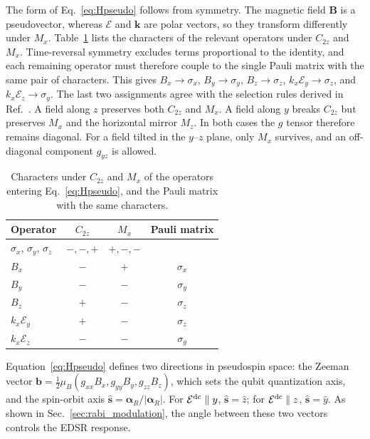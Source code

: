 \documentclass[
  aps,
  reprint,
  amsmath,
  amssymb,
  groupedaddress,
  floatfix,
  longbibliography,
]{revtex4-2}
\newcommand{\Edc}{\mathcal{E}^{\rm dc}}
\newcommand{\shat}{\hat{\mathbf s}}
\begin{document}
The form of Eq.~\eqref{eq:Hpseudo} follows from symmetry. The magnetic field $\mathbf{B}$ is a pseudovector, whereas $\boldsymbol{\mathcal{E}}$ and $\mathbf{k}$ are polar vectors, so they transform differently under $M_x$. Table~\ref{tab:symmetry} lists the characters of the relevant operators under $C_{2z}$ and $M_x$. Time-reversal symmetry excludes terms proportional to the identity, and each remaining operator must therefore couple to the single Pauli matrix with the same pair of characters. This gives $B_x\to\sigma_x$, $B_y\to\sigma_y$, $B_z\to\sigma_z$, $k_x\mathcal{E}_y\to\sigma_z$, and $k_x\mathcal{E}_z\to\sigma_y$. The last two assignments agree with the selection rules derived in Ref.~\cite{das2026anisotropic}. A field along $z$ preserves both $C_{2z}$ and $M_x$. A field along $y$ breaks $C_{2z}$ but preserves $M_x$ and the horizontal mirror $M_z$. In both cases the $g$ tensor therefore remains diagonal. For a field tilted in the $y$--$z$ plane, only $M_x$ survives, and an off-diagonal component $g_{yz}$ is allowed. 


\begin{table}[t]
\caption{Characters under $C_{2z}$ and $M_x$ of the operators entering Eq.~\eqref{eq:Hpseudo}, and the Pauli matrix with the same characters.}
\label{tab:symmetry}
\begin{ruledtabular}
\begin{tabular}{lccc}
Operator & $C_{2z}$ & $M_x$ & Pauli matrix\\
\hline
$\sigma_x$, $\sigma_y$, $\sigma_z$ & $-,-,+$ & $+,-,-$ & \\
$B_x$ & $-$ & $+$ & $\sigma_x$\\
$B_y$ & $-$ & $-$ & $\sigma_y$\\
$B_z$ & $+$ & $-$ & $\sigma_z$\\
$k_x\mathcal{E}_y$ & $+$ & $-$ & $\sigma_z$\\
$k_x\mathcal{E}_z$ & $-$ & $-$ & $\sigma_y$\\
\end{tabular}
\end{ruledtabular}
\end{table}

Equation~\eqref{eq:Hpseudo} defines two directions in pseudospin space: the Zeeman vector $\mathbf{b}=\tfrac12\mu_B(g_{xx}B_x,g_{yy}B_y,g_{zz}B_z)$, which sets the qubit quantization axis, and the spin-orbit axis $\shat=\bm{\alpha}_R/|\bm{\alpha}_R|$. For $\Edc\parallel y$, $\shat=\hat z$; for $\Edc\parallel z$, $\shat=\hat y$. As shown in Sec.~\ref{sec:rabi_modulation}, the angle between these two vectors controls the EDSR response.
\end{document}
